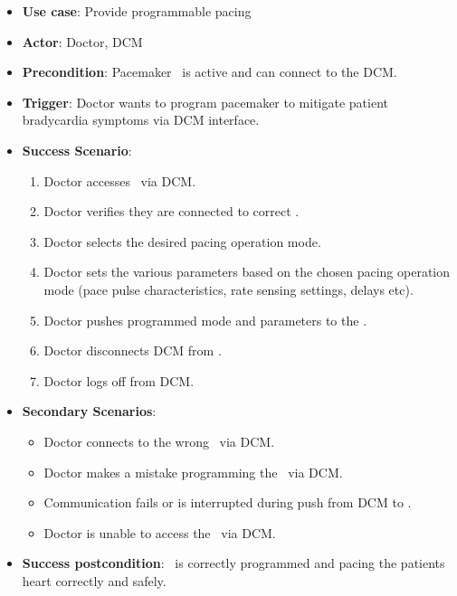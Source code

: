 \begin{itemize}
	\item \textbf{Use case}: Provide programmable pacing
	\item \textbf{Actor}: Doctor, DCM
	\item \textbf{Precondition}: Pacemaker \pgd\ is active and can connect to the DCM.
	\item \textbf{Trigger}: Doctor wants to program pacemaker to mitigate patient bradycardia symptoms via DCM interface.
	\item \textbf{Success Scenario}:
	\begin{enumerate}
		\item Doctor accesses \pgd\ via DCM.
		\item Doctor verifies they are connected to correct \pgd.
		\item Doctor selects the desired pacing operation mode.
		\item Doctor sets the various parameters based on the chosen pacing operation mode (pace pulse characteristics, rate sensing settings, delays etc).
		\item Doctor pushes programmed mode and parameters to the \pgd.
		\item Doctor disconnects DCM from \pgd.
		\item Doctor logs off from DCM.
	\end{enumerate}
	\item \textbf{Secondary Scenarios}:
	\begin{itemize}
		\item Doctor connects to the wrong \pgd\ via DCM.
		\item Doctor makes a mistake programming the \pgd\ via DCM.
		\item Communication fails or is interrupted during push from DCM to \pgd.
		\item Doctor is unable to access the \pgd\ via DCM.
	\end{itemize}
	\item \textbf{Success postcondition}: \pgd\ is correctly programmed and pacing the patients heart correctly and safely.
\end{itemize}

